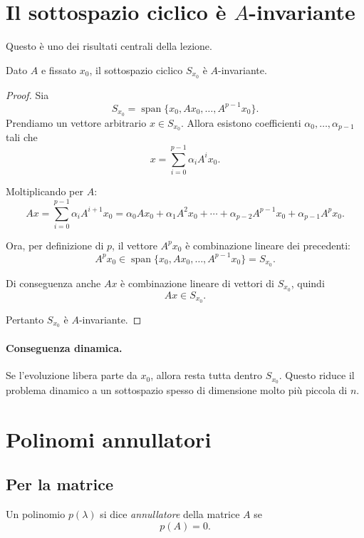 \section{Il sottospazio ciclico è \texorpdfstring{$A$}{A}-invariante}

Questo è uno dei risultati centrali della lezione.

\begin{teorema}
Dato $A$ e fissato $x_0$, il sottospazio ciclico $S_{x_0}$ è $A$-invariante.
\end{teorema}

\begin{proof}
Sia
\[
S_{x_0}=\operatorname{span}\{x_0,Ax_0,\dots,A^{p-1}x_0\}.
\]
Prendiamo un vettore arbitrario $x\in S_{x_0}$. Allora esistono coefficienti $\alpha_0,\dots,\alpha_{p-1}$ tali che
\[
x=\sum_{i=0}^{p-1}\alpha_i A^i x_0.
\]

Moltiplicando per $A$:
\[
Ax=\sum_{i=0}^{p-1}\alpha_i A^{i+1}x_0
=
\alpha_0Ax_0+\alpha_1A^2x_0+\cdots+\alpha_{p-2}A^{p-1}x_0+\alpha_{p-1}A^p x_0.
\]

Ora, per definizione di $p$, il vettore $A^p x_0$ è combinazione lineare dei precedenti:
\[
A^p x_0 \in \operatorname{span}\{x_0,Ax_0,\dots,A^{p-1}x_0\}=S_{x_0}.
\]

Di conseguenza anche $Ax$ è combinazione lineare di vettori di $S_{x_0}$, quindi
\[
Ax\in S_{x_0}.
\]

Pertanto $S_{x_0}$ è $A$-invariante.
\end{proof}

\paragraph{Conseguenza dinamica.}
Se l'evoluzione libera parte da $x_0$, allora resta tutta dentro $S_{x_0}$. Questo riduce il problema dinamico a un sottospazio spesso di dimensione molto più piccola di $n$.

\section{Polinomi annullatori}

\subsection{Per la matrice}

Un polinomio $p(\lambda)$ si dice \emph{annullatore} della matrice $A$ se
\begin{equation}
p(A)=0.
\label{eq:L5_annihilating_poly}
\end{equation}

